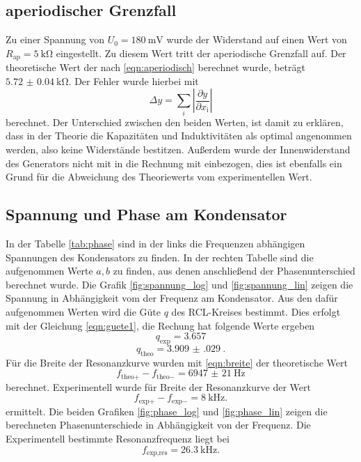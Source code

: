 \FloatBarrier

\subsection{aperiodischer Grenzfall}
Zu einer Spannung von $U_0 = \SI{180}{\milli\V}$ wurde der Widerstand auf einen Wert von $R_\text{ap} = \SI{5}{\kilo\ohm}$ eingestellt.
Zu diesem Wert tritt der aperiodische Grenzfall auf. Der theoretische Wert der nach \eqref{eqn:aperiodisch} berechnet wurde, beträgt $\SI{5.72(4)}{\kilo\ohm}$.
Der Fehler wurde hierbei mit 
\begin{equation}
    \Delta y = \sum_i \left | \frac{\partial y}{\partial x_\text{i}} \right |
    \label{eqn:fehler}
\end{equation}
berechnet.
Der Unterschied zwischen den beiden Werten, ist damit zu erklären, dass in der Theorie die Kapazitäten und Induktivitäten als optimal angenommen werden, also keine Widerstände bestitzen.
Außerdem wurde der Innenwiderstand des Generators nicht mit in die Rechnung mit einbezogen, dies ist ebenfalls ein Grund für die Abweichung des Theoriewerts vom experimentellen Wert.

\FloatBarrier  
\subsection{Spannung und Phase am Kondensator}
In der Tabelle \ref{tab:phase} sind in der links die Frequenzen abhängigen Spannungen des Kondensators zu finden.
In der rechten Tabelle sind die aufgenommen Werte $a, b$ zu finden, aus denen anschließend der Phasenunterschied berechnet wurde.
Die Grafik \ref{fig:spannung_log} und \ref{fig:spannung_lin} zeigen die Spannung in Abhängigkeit vom der Frequenz am Kondensator.
Aus den dafür aufgenommen Werten wird die Güte $q$ des RCL-Kreises bestimmt.
Dies erfolgt mit der Gleichung \eqref{eqn:guete1}, die Rechung hat folgende Werte ergeben
\begin{equation*}
    q_\text{exp} = 3.657
\end{equation*}
\begin{equation*}
    q_\text{theo} =  \SI{3.909(029)}{}.
\end{equation*}
Für die Breite der Resonanzkurve wurden mit \eqref{eqn:breite} der theoretische Wert 
\begin{equation*}
    f_{\text{theo}+}- f_{\text{theo}-} = \SI{6947(21)}{\hertz}
\end{equation*}
berechnet.
Experimentell wurde für Breite der Resonanzkurve der Wert 
\begin{equation*}
    f_{\text{exp}+}-f_{\text{exp}-} = \SI{8}{\kilo\hertz}.
\end{equation*}
ermittelt.
Die beiden Grafiken \ref{fig:phase_log} und \ref{fig:phase_lin} zeigen die berechneten Phasenunterschiede in Abhängigkeit von der Frequenz.
Die Experimentell bestimmte Resonanzfrequenz liegt bei 
\begin{equation*}
    f_{\text{exp},\text{res}} = \SI{26.3}{\kilo\hertz}.
\end{equation*}

